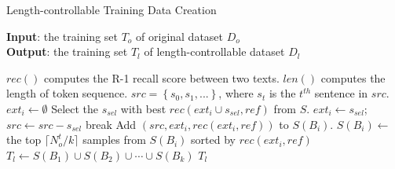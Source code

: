 \begin{algorithm}[th!]
	\caption{Length-controllable Training Data Creation}
	\label{alg:data}
	\scriptsize
	\textbf{Input}: the training set $T_{o}$  of original dataset $D_o$ \\
	\textbf{Output}:  the training set $T_{l}$ of length-controllable dataset $D_l$ \\
	\begin{algorithmic}[1] %
		\STATE $rec()$ computes the R-1 recall score between two texts.
		\STATE $len()$ computes the length of token sequence.
		\STATE $src=\left\{s_0, s_1,...\right\}$, where $s_t$ is the $t^{th}$ sentence in $src$.
		\STATE $ext_i \leftarrow \emptyset$
	    \STATE Select the $s_{sel}$ with best $rec(ext_i\cup s_{sel}, ref)$ from $S$.
		\STATE $ext_i \leftarrow s_{sel}$; $src \leftarrow src-s_{sel}$
		\ELSE 
		\STATE break
		\ENDIF
		\ENDWHILE
		\STATE Add $(src, ext_i, rec(ext_i,ref))$ to $S(B_i)$.
		\ENDIF
		\ENDFOR
		\ENDFOR
		\STATE $S(B_i) \leftarrow$ the top $\lceil N_{o}^{t}/k \rceil$ samples from $S(B_i)$ sorted by $rec(ext_i,ref)$
		\STATE $T_{l} \leftarrow S(B_1) \cup S(B_2)\cup \cdots \cup S(B_k)$
		\RETURN $T_{l}$
	\end{algorithmic}
\end{algorithm}


